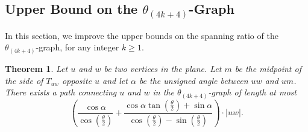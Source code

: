 \documentclass[12pt]{article}
\newtheorem{theo}[defin]{Theorem}
\newenvironment{theorem}{\begin{theo} \sl}{\end{theo}}
\newcommand{\Graph}[1]{\ensuremath{\theta_{(4 k + #1)}}-Graph\xspace}
\newcommand{\graph}[1]{\ensuremath{\theta_{(4 k + #1)}}-graph\xspace}
\newcommand{\canon}[2]{\ensuremath{T_{#1 #2}}}
\begin{document}
\subsection{Upper Bound on the \Graph{4}}
\label{subsec:Theta4k+4}
In this section, we improve the upper bounds on the spanning ratio of the \graph{4}, for any integer $k \geq 1$. 

\begin{theorem}
  \label{theo:PathLength4k+4}
  Let $u$ and $w$ be two vertices in the plane. Let $m$ be the midpoint of the side of \canon{u}{w} opposite $u$ and let $\alpha$ be the unsigned angle between $u w$ and $u m$. There exists a path connecting $u$ and $w$ in the \graph{4} of length at most 
  \[\left( \frac{\cos \alpha}{\cos \left(\frac{\theta}{2}\right)} + \frac{\cos \alpha \tan \left(\frac{\theta}{2}\right) + \sin \alpha}{\cos \left(\frac{\theta}{2}\right) - \sin \left(\frac{\theta}{2}\right)} \right) \cdot |u w|.\] 
\end{theorem}
\end{document}
